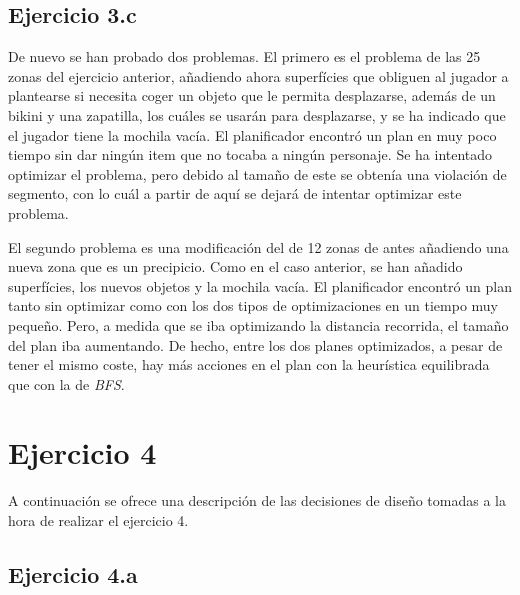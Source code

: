 \documentclass[11pt,a4paper]{article}
\begin{document}
\subsection{Ejercicio 3.c}

De nuevo se han probado dos problemas. El primero es el problema de las 25 zonas del ejercicio anterior, añadiendo ahora
superfícies que obliguen al jugador a plantearse si necesita coger un objeto que le permita desplazarse, además de un bikini y una
zapatilla, los cuáles se usarán para desplazarse, y se ha indicado que el jugador tiene la mochila vacía. El planificador encontró un
plan en muy poco tiempo sin dar ningún item que no tocaba a ningún personaje. Se ha intentado optimizar el problema, pero debido al
tamaño de este se obtenía una violación de segmento, con lo cuál a partir de aquí se dejará de intentar optimizar este problema.

El segundo problema es una modificación del de 12 zonas de antes añadiendo una nueva zona que es un precipicio. Como en el caso
anterior, se han añadido superfícies, los nuevos objetos y la mochila vacía. El planificador encontró un plan tanto sin optimizar como
con los dos tipos de optimizaciones en un tiempo muy pequeño. Pero, a medida que se iba optimizando la distancia recorrida, el tamaño
del plan iba aumentando. De hecho, entre los dos planes optimizados, a pesar de tener el mismo coste, hay más acciones en el plan con
la heurística equilibrada que con la de \textit{BFS}.

\section{Ejercicio 4}

A continuación se ofrece una descripción de las decisiones de diseño tomadas a la hora de realizar el ejercicio 4.

\subsection{Ejercicio 4.a}
\end{document}
